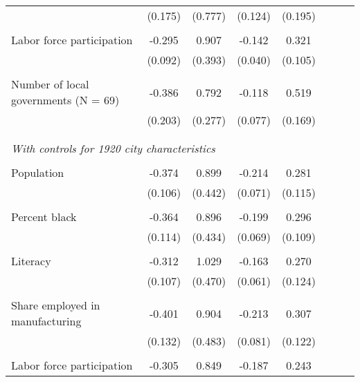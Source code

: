 \begin{table}[H]
{\begin{threeparttable}
\begin{tabular}{lccccccc}
            &     (0.175)         &     (0.777)         &     (0.124)         &     (0.195)         \\
\smallskip \\
Labor force participation&      -0.295\sym{***}&       0.907\sym{**} &      -0.142\sym{***}&       0.321\sym{***}\\
            &     (0.092)         &     (0.393)         &     (0.040)         &     (0.105)         \\
\smallskip \\
Number of local governments (N = 69)&      -0.386\sym{*}  &       0.792\sym{***}&      -0.118         &       0.519\sym{***}\\
            &     (0.203)         &     (0.277)         &     (0.077)         &     (0.169)         \\
\smallskip \\
\smallskip \\
 \multicolumn{4}{l}{\emph{With controls for 1920 city characteristics}} & \\
\smallskip \\
Population  &      -0.374\sym{***}&       0.899\sym{**} &      -0.214\sym{***}&       0.281\sym{**} \\
            &     (0.106)         &     (0.442)         &     (0.071)         &     (0.115)         \\
\smallskip \\
Percent black&      -0.364\sym{***}&       0.896\sym{**} &      -0.199\sym{***}&       0.296\sym{***}\\
            &     (0.114)         &     (0.434)         &     (0.069)         &     (0.109)         \\
\smallskip \\
Literacy    &      -0.312\sym{***}&       1.029\sym{**} &      -0.163\sym{***}&       0.270\sym{**} \\
            &     (0.107)         &     (0.470)         &     (0.061)         &     (0.124)         \\
\smallskip \\
Share employed in manufacturing&      -0.401\sym{***}&       0.904\sym{*}  &      -0.213\sym{***}&       0.307\sym{**} \\
            &     (0.132)         &     (0.483)         &     (0.081)         &     (0.122)         \\
\smallskip \\
Labor force participation&      -0.305\sym{***}&       0.849\sym{**} &      -0.187\sym{***}&       0.243\sym{**} \\

\end{tabular}
\end{threeparttable}}
\end{table}
